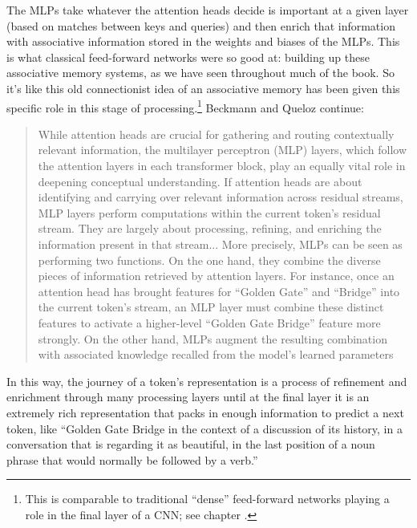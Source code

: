 The MLPs take whatever the attention heads decide is important at a given layer (based on matches between keys and queries) and then enrich that information with associative information stored in the weights and biases of the MLPs. This is what classical feed-forward networks were so good at: building up these associative memory systems, as we have seen throughout much of the book. So it's like this old connectionist idea of an associative memory has been given this specific role in this stage of processing.\footnote{This is comparable to traditional ``dense'' feed-forward networks playing a role in the final layer of a CNN; see chapter .} Beckmann and Queloz continue:
\begin{quote}
While attention heads are crucial for gathering and routing contextually relevant information, the multilayer perceptron (MLP) layers, which follow the attention layers in each transformer block, play an equally vital role in deepening conceptual understanding. If attention heads are about identifying and carrying over relevant information across residual streams, MLP layers perform computations within the current token's residual stream. They are largely about processing, refining, and enriching the information present in that stream... More precisely, MLPs can be seen as performing two functions. On the one hand, they combine the diverse pieces of information retrieved by attention layers. For instance, once an attention head has brought features for ``Golden Gate'' and ``Bridge'' into the current token's stream, an MLP layer must combine these distinct features to activate a higher-level ``Golden Gate Bridge'' feature more strongly. On the other hand, MLPs augment the resulting combination with associated knowledge recalled from the model's learned parameters
\end{quote}

In this way, the journey of a token's representation is a process of refinement and enrichment through many processing layers until at the final layer it is an extremely rich representation that packs in enough information to predict a next token, like ``Golden Gate Bridge in the context of a discussion of its history, in a conversation that is regarding it as beautiful, in the last position of a noun phrase that would normally be followed by a verb.''

